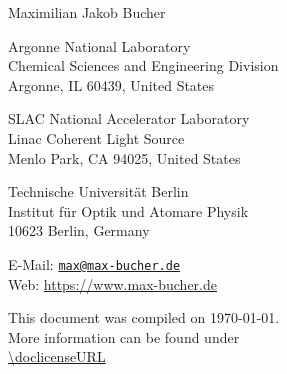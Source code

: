 \begin{flushleft}
{\Large Maximilian Jakob Bucher}\\
\footnotesize{Argonne National Laboratory\\
Chemical Sciences and Engineering Division\\
Argonne, IL 60439, United States\\
\vspace{0.5cm}

SLAC National Accelerator Laboratory\\
Linac Coherent Light Source\\
Menlo Park, CA 94025, United States
\vspace{0.5cm}

Technische Universit{\"a}t Berlin\\
Institut f{\"u}r Optik und Atomare Physik\\
10623 Berlin, Germany
\vspace{0.5cm}

E-Mail: \href{mailto:max@max-bucher.de}{\nolinkurl{max@max-bucher.de} }\\
Web: \url{https://www.max-bucher.de}}
\end{flushleft}
%
%
%
\vspace{9.5cm}
This document was compiled on {\isodate\today}.\\
%
\null
%
\doclicenseThis
More information can be found under\\
\url{\doclicenseURL}
